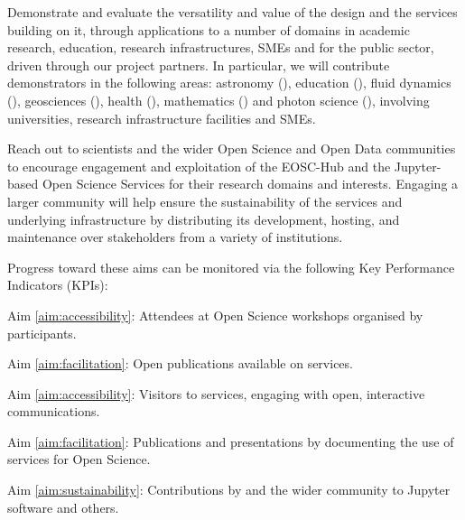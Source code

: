 \begin{compactenum}
\item \label{obj:demonstrators} %
  Demonstrate and evaluate the  versatility and value of the design and
  the services building on it, through applications to a number of
  domains in academic research, education, research infrastructures, SMEs and for
  the public sector, driven through our project partners. In
  particular, we will contribute demonstrators in the following areas:
  astronomy (), education
  (), fluid dynamics
  (), geosciences
  (), health
  (), mathematics
  () and photon science
  (), involving
  universities, research infrastructure facilities and SMEs.

\item \label{obj:outreach-and-engagement} %
  Reach out to scientists and the wider Open Science and Open Data
  communities to encourage engagement
  and exploitation of the EOSC-Hub and the Jupyter-based Open Science
  Services for their research domains and interests.
  Engaging a larger community will help ensure the sustainability of
  the services and underlying infrastructure by distributing its
  development, hosting, and maintenance over stakeholders from a
  variety of institutions.

\end{compactenum}

\noindent Progress toward these aims can be monitored via the following
Key Performance Indicators (KPIs):

\begin{compactenum}
  \item \label{kpi:workshop-attendees}
    Aim \ref{aim:accessibility}:
    Attendees at Open Science workshops organised by \TheProject participants.
  \item \label{kpi:binder-publications}
    Aim \ref{aim:facilitation}:
    Open publications available on \TheProject services.
  \item \label{kpi:binder-visits}
    Aim \ref{aim:accessibility}:
    Visitors to \TheProject services, engaging with open, interactive communications.
  \item \label{kpi:dissemination}
    Aim \ref{aim:facilitation}:
    Publications and presentations by \TheProject documenting the use of \TheProject services for Open Science.
  \item \label{kpi:contributions}
    Aim \ref{aim:sustainability}:
    Contributions by \TheProject and the wider community to Jupyter software and others.
\end{compactenum}


